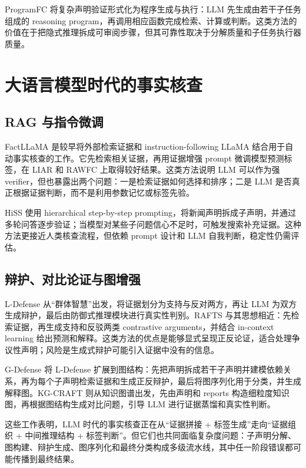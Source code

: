 \documentclass[UTF8,a4paper,zihao=5,twocolumn]{ctexart}
\begin{document}
ProgramFC 将复杂声明验证形式化为程序生成与执行：LLM 先生成由若干子任务组成的 reasoning program，再调用相应函数完成检索、计算或判断\cite{Pan2023ProgramFC}。这类方法的价值在于把隐式推理拆成可审阅步骤，但其可靠性取决于分解质量和子任务执行器质量。

\section{大语言模型时代的事实核查}

\subsection{RAG 与指令微调}

FactLLaMA 是较早将外部检索证据和 instruction-following LLaMA 结合用于自动事实核查的工作。它先检索相关证据，再用证据增强 prompt 微调模型预测标签，在 LIAR 和 RAWFC 上取得较好结果\cite{Cheung2023FactLLaMA}。这类方法说明 LLM 可以作为强 verifier，但也暴露出两个问题：一是检索证据如何选择和排序；二是 LLM 是否真正根据证据判断，而不是利用参数记忆或标签先验。

HiSS 使用 hierarchical step-by-step prompting，将新闻声明拆成子声明，并通过多轮问答逐步验证；当模型对某些子问题信心不足时，可触发搜索补充证据\cite{Zhang2023HiSS}。这种方法更接近人类核查流程，但依赖 prompt 设计和 LLM 自我判断，稳定性仍需评估。

\subsection{辩护、对比论证与图增强}

L-Defense 从“群体智慧”出发，将证据划分为支持与反对两方，再让 LLM 为双方生成辩护，最后由防御式推理模块进行真实性判别\cite{Wang2024LDefense}。RAFTS 与其思想相近：先检索证据，再生成支持和反驳两类 contrastive arguments，并结合 in-context learning 给出预测和解释\cite{Yue2024RAFTS}。这类方法的优点是能够显式呈现正反论证，适合处理争议性声明；风险是生成式辩护可能引入证据中没有的信息。

G-Defense 将 L-Defense 扩展到图结构：先把声明拆成若干子声明并建模依赖关系，再为每个子声明检索证据和生成正反辩护，最后将图序列化用于分类，并生成解释图\cite{Wang2026GDefense}。KG-CRAFT 则从知识图谱出发，先由声明和 reports 构造细粒度知识图，再根据图结构生成对比问题，引导 LLM 进行证据蒸馏和真实性判断\cite{Lourenco2026KGCRAFT}。

这些工作表明，LLM 时代的事实核查正在从“证据拼接 + 标签生成”走向“证据组织 + 中间推理结构 + 标签判断”。但它们也共同面临复杂度问题：子声明分解、图构建、辩护生成、图序列化和最终分类构成多级流水线，其中任一阶段错误都可能传播到最终结果。
\end{document}
